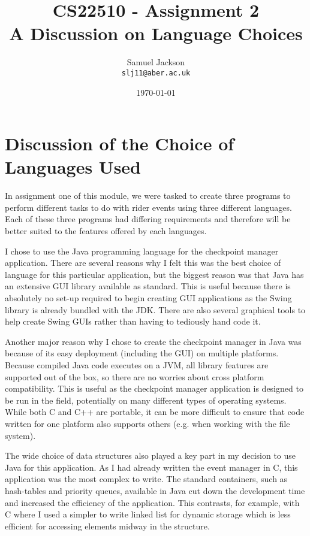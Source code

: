\documentclass{article}
\begin{document}
\title{CS22510 - Assignment 2 \\ A Discussion on Language Choices}
\author{Samuel Jackson \\ \texttt{slj11@aber.ac.uk}}
\date{\today}
\maketitle

\section{Discussion of the Choice of Languages Used}
In assignment one of this module, we were tasked to create three programs to perform different tasks to do with rider events using three different languages. Each of these three programs had differing requirements and therefore will be better suited to the features offered by each languages.

I chose to use the Java programming language for the checkpoint manager application. There are several reasons why I felt this was the best choice of language for this particular application, but the biggest reason was that Java has an extensive GUI library available as standard. This is useful because there is absolutely no set-up required to begin creating GUI applications as the Swing library is already bundled with the JDK. There are also several graphical tools to help create Swing GUIs rather than having to tediously hand code it.

Another major reason why I chose to create the checkpoint manager in Java was because of its easy deployment (including the GUI) on multiple platforms. Because compiled Java code executes on a JVM, all library features are supported out of the box, so there are no worries about cross platform compatibility. This is useful as the checkpoint manager application is designed to be run in the field, potentially on many different types of operating systems. While both C and C++ are portable, it can be more difficult to ensure that code written for one platform also supports others (e.g. when working with the file system).

The wide choice of data structures also played a key part in my decision to use Java for this application. As I had already written the event manager in C, this application was the most complex to write. The standard containers, such as hash-tables and priority queues, available in Java cut down the development time and increased the efficiency of the application. This contrasts, for example, with C where I used a simpler to write linked list for dynamic storage which is less efficient for accessing elements midway in the structure.
\end{document}
